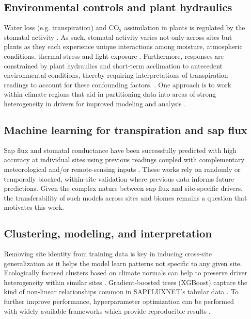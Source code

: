 \documentclass[graybox]{svmult}
\begin{document}
\subsection{Environmental controls and plant hydraulics}
Water loss (e.g. transpiration) and CO$_2$ assimilation in plants is regulated by the stomatal activity \cite{mott_stomatal_2010}. As such, stomatal activity varies not only across sites but plants as they each experience unique interactions among moisture, atmospheric conditions, thermal stress and light exposure \cite{liu_soil_2020, zheng_divergent_2023}. Furthermore, responses are constrained by plant hydraulics and short-term acclimation to antecedent environmental conditions, thereby requiring interpretations of transpiration readings to account for these confounding factors. \cite{tyree_hydraulic_2003, poirier-pocovi_sensitivity_2020, anav_sensitivity_2018, jiang_optimalitybased_2020, stocker_p-model_2020}. One approach is to work within climate regions that aid in partitioning data into areas of strong heterogeneity in drivers for improved modeling and analysis \cite{peel_updated_2007}.

\subsection{Machine learning for transpiration and sap flux}
Sap flux and stomatal conductance have been successfully predicted with high accuracy at individual sites using previous readings coupled with complementary meteorological and/or remote-sensing inputs \cite{ellsaser_predicting_2020, kabala_reconstruction_2025}. These works rely on randomly or temporally blocked, within-site validation where previous data informs future predictions. Given the complex nature between sap flux and site-specific drivers, the transferability of such models across sites and biomes remains a question that motivates this work.

\subsection{Clustering, modeling, and interpretation}
Removing site identity from training data is key in inducing cross-site generalization as it helps the model learn patterns not specific to any given site. Ecologically focused clusters based on climate normals can help to preserve driver heterogeneity within similar sites \cite{peel_updated_2007}. Gradient-boosted trees (XGBoost) capture the kind of non-linear relationships common in SAPFLUXNET's tabular data \cite{chen_xgboost_2016}. To further improve performance, hyperparameter optimization can be performed with widely available frameworks which provide reproducible results \cite{akiba_optuna_2019}.
\end{document}
